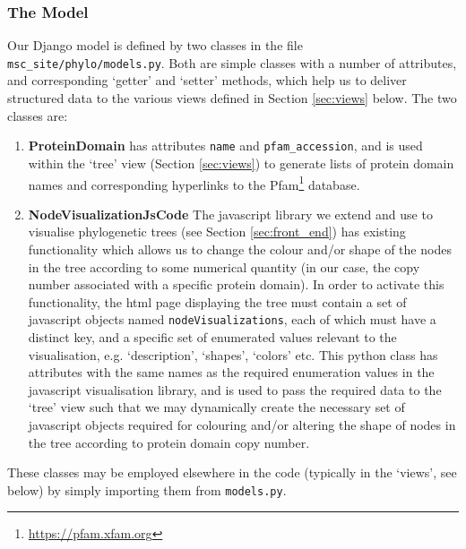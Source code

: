 \documentclass[12pt,a4paper]{article}
\begin{document}
\subsubsection{The Model}
\label{sec:model}
Our Django model is defined by two classes in the file \texttt{msc\_site/phylo/models.py}. Both are simple classes with a number of attributes, and corresponding `getter' and `setter' methods, which help us to deliver structured data to the various views defined in Section \ref{sec:views} below. The two classes are:

\begin{enumerate}
\item {\bf ProteinDomain} has attributes \texttt{name} and \texttt{pfam\_accession}, and is used within the `tree' view (Section \ref{sec:views}) to generate lists of protein domain names and corresponding hyperlinks to the Pfam\footnote{\url{https://pfam.xfam.org}} database.
\item {\bf NodeVisualizationJsCode} The javascript library we extend and use to visualise phylogenetic trees (see Section \ref{sec:front_end}) has existing functionality which allows us to change the colour and/or shape of the nodes in the tree according to some numerical quantity (in our case, the copy number associated with a specific protein domain). In order to activate this functionality, the html page displaying the tree must contain a set of javascript objects named \texttt{nodeVisualizations}, each of which must have a distinct key, and a specific set of enumerated values relevant to the visualisation, e.g. `description', `shapes', `colors' etc. This python class has attributes with the same names as the required enumeration values in the javascript visualisation library, and is used to pass the required data to the `tree' view such that we may dynamically create the necessary set of javascript objects required for colouring and/or altering the shape of nodes in the tree according to protein domain copy number.
\end{enumerate}

These classes may be employed elsewhere in the code (typically in the `views', see below) by simply importing them from \texttt{models.py}.
\end{document}
